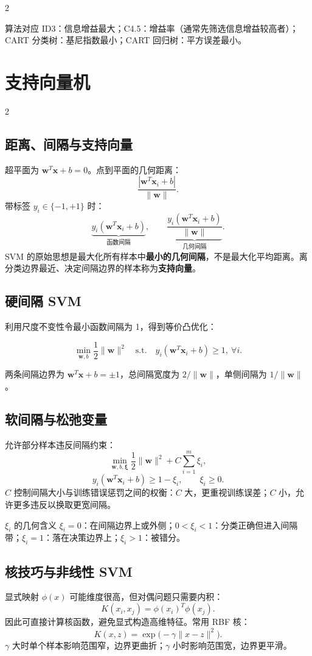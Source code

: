\documentclass[9pt,a4paper,UTF8]{ctexart}
\newcommand{\term}[1]{\textbf{\color{teal}#1}}
\begin{document}
\begin{multicols}{2}
\begin{keybox}{算法对应}
ID3：信息增益最大；C4.5：增益率（通常先筛选信息增益较高者）；CART 分类树：基尼指数最小；CART 回归树：平方误差最小。
\end{keybox}
\end{multicols}

\section{支持向量机}
\begin{multicols}{2}
\subsection{距离、间隔与支持向量}
超平面为 $\bm w^T\bm x+b=0$。点到平面的几何距离：
\[
\frac{|\bm w^T\bm x_i+b|}{\|\bm w\|}.
\]
带标签 $y_i\in\{-1,+1\}$ 时：
\[
\underbrace{y_i(\bm w^T\bm x_i+b)}_{\text{函数间隔}},\qquad
\underbrace{\frac{y_i(\bm w^T\bm x_i+b)}{\|\bm w\|}}_{\text{几何间隔}}.
\]
SVM 的原始思想是最大化所有样本中\textbf{最小的几何间隔}，不是最大化平均距离。离分类边界最近、决定间隔边界的样本称为\term{支持向量}。

\subsection{硬间隔 SVM}
利用尺度不变性令最小函数间隔为 1，得到等价凸优化：
\begin{formbox}
\[
\min_{\bm w,b}\frac12\|\bm w\|^2
\quad\mathrm{s.t.}\quad
y_i(\bm w^T\bm x_i+b)\ge1,\ \forall i.
\]
\end{formbox}
两条间隔边界为 $\bm w^T\bm x+b=\pm1$，总间隔宽度为 $2/\|\bm w\|$，单侧间隔为 $1/\|\bm w\|$。

\subsection{软间隔与松弛变量}
允许部分样本违反间隔约束：
\[
\min_{\bm w,b,\bm\xi}\frac12\|\bm w\|^2+C\sum_{i=1}^{m}\xi_i,
\]
\[
y_i(\bm w^T\bm x_i+b)\ge1-\xi_i,\qquad \xi_i\ge0.
\]
$C$ 控制间隔大小与训练错误惩罚之间的权衡：$C$ 大，更重视训练误差；$C$ 小，允许更多违反以换取更宽间隔。

\begin{warnbox}{$\xi_i$ 的几何含义}
$\xi_i=0$：在间隔边界上或外侧；$0<\xi_i<1$：分类正确但进入间隔带；$\xi_i=1$：落在决策边界上；$\xi_i>1$：被错分。
\end{warnbox}

\subsection{核技巧与非线性 SVM}
显式映射 $\phi(x)$ 可能维度很高，但对偶问题只需要内积：
\[
K(x_i,x_j)=\phi(x_i)^T\phi(x_j).
\]
因此可直接计算核函数，避免显式构造高维特征。常用 RBF 核：
\[
K(x,z)=\exp\bigl(-\gamma\|x-z\|^2\bigr).
\]
$\gamma$ 大时单个样本影响范围窄，边界更曲折；$\gamma$ 小时影响范围宽，边界更平滑。


\end{multicols}
\end{document}
